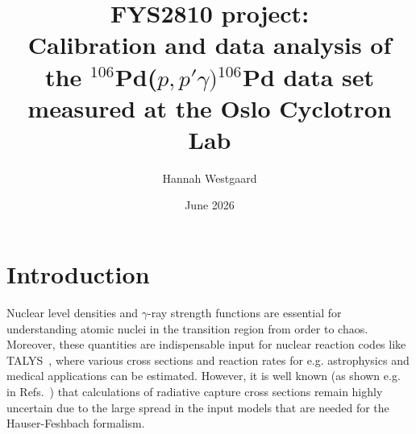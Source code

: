 \documentclass[a4paper,11pt]{article}
\title{FYS2810 project: \\ Calibration and data analysis of the  $^{106}$Pd($p,p'\gamma)$$^{106}$Pd data set measured at the Oslo Cyclotron Lab}
\author{Hannah Westgaard}
\date{June 2026}
\begin{document}
\maketitle

\section{Introduction}

Nuclear level densities and $\gamma$-ray strength functions are essential for understanding atomic nuclei in the transition region from order to chaos. 
Moreover, these quantities are indispensable input for nuclear reaction codes like TALYS~\cite{TALYS}, where various cross sections and reaction rates for e.g. astrophysics and medical applications can be estimated. 
However, it is well known (as shown e.g. in Refs.~\cite{Laplace2015,Larsen2016}) that calculations of radiative capture cross sections remain highly uncertain due to the large spread in the input models that are needed for the Hauser-Feshbach formalism. 
\end{document}
